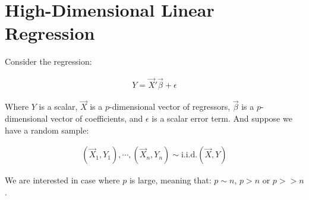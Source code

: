 \section{High-Dimensional Linear Regression}

Consider the regression: 

\begin{align*}
    Y = \Vec{X}'\Vec{\beta} + \epsilon
\end{align*}

Where $Y$ is a scalar, $\Vec{X}$ is a $p$-dimensional vector of regressors, $\Vec{\beta}$ is a $p$-dimensional vector of coefficients, and $\epsilon$ is a scalar error term. And suppose we have a random sample:

\begin{align*}
    (\Vec{X}_1, Y_1), \cdots, (\Vec{X}_n, Y_n) \sim \text{i.i.d.} (\Vec{X}, Y)
\end{align*}

We are interested in case where $p$ is large, meaning that: $p \sim n$, $p > n$ or $p >> n$.

